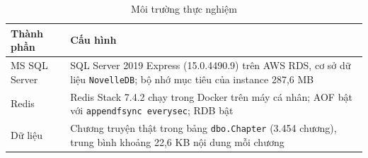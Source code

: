 \begin{table}[H]
\centering
\small
\renewcommand{\arraystretch}{1.25}
\begin{tabular}{|p{}|p{}|}
\hline
\textbf{Thành phần} & \textbf{Cấu hình} \\ \hline
MS SQL Server & SQL Server 2019 Express (15.0.4490.9) trên AWS RDS, cơ sở dữ liệu \texttt{NovelleDB}; bộ nhớ mục tiêu của instance 287,6 MB \\ \hline
Redis & Redis Stack 7.4.2 chạy trong Docker trên máy cá nhân; AOF bật với \texttt{appendfsync everysec}; RDB bật \\ \hline
Dữ liệu & Chương truyện thật trong bảng \texttt{dbo.Chapter} (3.454 chương), trung bình khoảng 22,6 KB nội dung mỗi chương \\ \hline
\end{tabular}
\caption{Môi trường thực nghiệm}
\label{tab:ds-environment}
\end{table}

